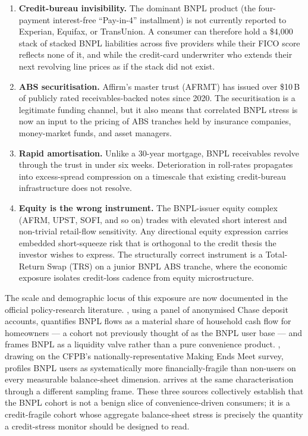 \documentclass[11pt,letterpaper]{article}
\begin{document}
\begin{enumerate}[leftmargin=*]
\item \textbf{Credit-bureau invisibility.} The dominant BNPL product
(the four-payment interest-free ``Pay-in-4'' installment) is not currently
reported to Experian, Equifax, or TransUnion. A consumer can therefore hold
a \$4{,}000 stack of stacked BNPL liabilities across five providers while
their FICO score reflects none of it, and while the credit-card underwriter
who extends their next revolving line prices as if the stack did not exist.
\item \textbf{ABS securitisation.} Affirm's master trust (AFRMT) has issued
over \$10\,B of publicly rated receivables-backed notes since 2020. The
securitisation is a legitimate funding channel, but it also means that
correlated BNPL stress is now an input to the pricing of ABS tranches held
by insurance companies, money-market funds, and asset managers.
\item \textbf{Rapid amortisation.} Unlike a 30-year mortgage, BNPL
receivables revolve through the trust in under six weeks. Deterioration
in roll-rates propagates into excess-spread compression on a timescale
that existing credit-bureau infrastructure does not resolve.
\item \textbf{Equity is the wrong instrument.} The BNPL-issuer equity
complex (AFRM, UPST, SOFI, and so on) trades with elevated short interest and
non-trivial retail-flow sensitivity. Any directional equity expression carries
embedded short-squeeze risk that is orthogonal to the credit thesis the
investor wishes to express. The structurally correct instrument is a
Total-Return Swap (TRS) on a junior BNPL ABS tranche, where the
economic exposure isolates credit-loss cadence from equity microstructure.
\end{enumerate}

The scale and demographic locus of this exposure are now
documented in the official policy-research literature.
\citet{jpmc2024bnpl}, using a panel of anonymised Chase
deposit accounts, quantifies BNPL flows as a material share of
household cash flow for homeowners --- a cohort not previously
thought of as the BNPL user base --- and frames BNPL as a
liquidity valve rather than a pure convenience product.
\citet{cfpb2024makingendsmeet}, drawing on the CFPB's
nationally-representative Making Ends Meet survey, profiles
BNPL users as systematically more financially-fragile than
non-users on every measurable balance-sheet dimension.
\citet{fedboston2024bnpl} arrives at the same characterisation
through a different sampling frame. These three sources
collectively establish that the BNPL cohort is not a benign
slice of convenience-driven consumers; it is a credit-fragile
cohort whose aggregate balance-sheet stress is precisely the
quantity a credit-stress monitor should be designed to read.
\end{document}
